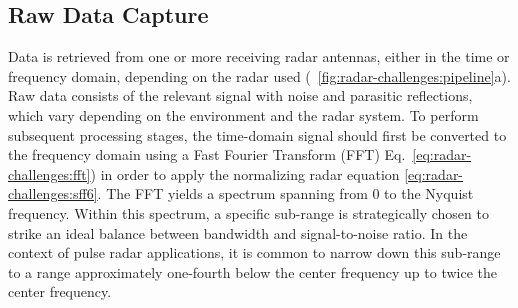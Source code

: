 \subsection{Raw Data Capture} \label{sec:radar-challenges:processing-strategy:data-capture}
Data is retrieved from one or more receiving radar antennas, either in the time or frequency domain, depending on the radar used (\fig~\ref{fig:radar-challenges:pipeline}a). 
Raw data consists of the relevant signal with noise and parasitic reflections, which vary depending on the environment and the radar system.
To perform subsequent processing stages, the time-domain signal should first be converted to the frequency domain using a Fast Fourier Transform (FFT)  Eq.~\ref{eq:radar-challenges:fft}) in order to apply the normalizing radar equation \ref{eq:radar-challenges:sff6}. The FFT yields a spectrum spanning from 0 to the Nyquist frequency. Within this spectrum, a specific sub-range is strategically chosen to strike an ideal balance between bandwidth and signal-to-noise ratio. In the context of pulse radar applications, it is common to narrow down this sub-range to a range approximately one-fourth below the center frequency up to twice the center frequency.

